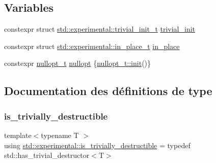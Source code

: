 \subsection*{Variables}
\begin{DoxyCompactItemize}
\item 
constexpr struct \hyperlink{structstd_1_1experimental_1_1trivial__init__t}{std\+::experimental\+::trivial\+\_\+init\+\_\+t} \hyperlink{namespacestd_1_1experimental_a453a56e465f134032297679f0511f02b}{trivial\+\_\+init}
\item 
constexpr struct \hyperlink{structstd_1_1experimental_1_1in__place__t}{std\+::experimental\+::in\+\_\+place\+\_\+t} \hyperlink{namespacestd_1_1experimental_a93be82cb49ba2dc64a23c881ad152fd6}{in\+\_\+place}
\item 
constexpr \hyperlink{structstd_1_1experimental_1_1nullopt__t}{nullopt\+\_\+t} \hyperlink{namespacestd_1_1experimental_af16e944368340cafdc29647c42a1f542}{nullopt} \{\hyperlink{structstd_1_1experimental_1_1nullopt__t_1_1init}{nullopt\+\_\+t\+::init}()\}
\end{DoxyCompactItemize}


\subsection{Documentation des définitions de type}
\mbox{\label{namespacestd_1_1experimental_a481cc29b2f00961d0afc189e6e90f739}} 
\subsubsection{\texorpdfstring{is\+\_\+trivially\+\_\+destructible}{is\_trivially\_destructible}}
{\footnotesize\ttfamily template$<$typename T $>$ \\
using \hyperlink{namespacestd_1_1experimental_a481cc29b2f00961d0afc189e6e90f739}{std\+::experimental\+::is\+\_\+trivially\+\_\+destructible} = typedef std\+::has\+\_\+trivial\+\_\+destructor$<$T$>$}

\mbox{\label{namespacestd_1_1experimental_a33aa5e258a2b0762197365c1ef3f90aa}} 
